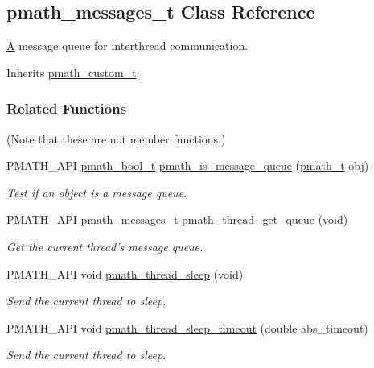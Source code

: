\hypertarget{classpmath__messages__t}{
\subsection{pmath\_\-messages\_\-t Class Reference}
\label{classpmath__messages__t}
}
\hyperlink{class_a}{A} message queue for interthread communication.  


Inherits \hyperlink{classpmath__custom__t}{pmath\_\-custom\_\-t}.

\subsubsection*{Related Functions}
(Note that these are not member functions.) \begin{CompactItemize}
\item 
PMATH\_\-API \hyperlink{group__general__types_gc92090cb0b56345d6c379ed2341d4ef4}{pmath\_\-bool\_\-t} \hyperlink{group__threadmsg_g93b45ad8c3063c94602c8bbaaf3c2613}{pmath\_\-is\_\-message\_\-queue} (\hyperlink{classpmath__t}{pmath\_\-t} obj)
\begin{CompactList}\small\item\em Test if an object is a message queue. \item\end{CompactList}\item 
PMATH\_\-API \hyperlink{classpmath__messages__t}{pmath\_\-messages\_\-t} \hyperlink{group__threadmsg_gf4d69db0ffe06846e57df7cadcd3dab6}{pmath\_\-thread\_\-get\_\-queue} (void)
\begin{CompactList}\small\item\em Get the current thread's message queue. \item\end{CompactList}\item 
PMATH\_\-API void \hyperlink{group__threadmsg_gce6da6e34b0aeab35094ddccdd9a3e55}{pmath\_\-thread\_\-sleep} (void)
\begin{CompactList}\small\item\em Send the current thread to sleep. \item\end{CompactList}\item 
PMATH\_\-API void \hyperlink{group__threadmsg_g199f3dc07d4b89174e641fa4b0b757db}{pmath\_\-thread\_\-sleep\_\-timeout} (double abs\_\-timeout)
\begin{CompactList}\small\item\em Send the current thread to sleep. \item\end{CompactList}\item 

\end{CompactItemize}

